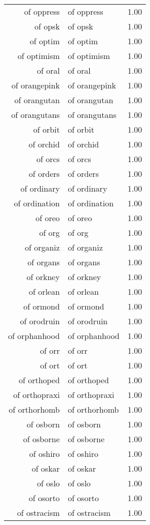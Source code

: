 \begin{table}[ht]
\begin{tabular}{rlr}
  of oppress & of oppress & 1.00 \\ 
  of opsk & of opsk & 1.00 \\ 
  of optim & of optim & 1.00 \\ 
  of optimism & of optimism & 1.00 \\ 
  of oral & of oral & 1.00 \\ 
  of orangepink & of orangepink & 1.00 \\ 
  of orangutan & of orangutan & 1.00 \\ 
  of orangutans & of orangutans & 1.00 \\ 
  of orbit & of orbit & 1.00 \\ 
  of orchid & of orchid & 1.00 \\ 
  of orcs & of orcs & 1.00 \\ 
  of orders & of orders & 1.00 \\ 
  of ordinary & of ordinary & 1.00 \\ 
  of ordination & of ordination & 1.00 \\ 
  of oreo & of oreo & 1.00 \\ 
  of org & of org & 1.00 \\ 
  of organiz & of organiz & 1.00 \\ 
  of organs & of organs & 1.00 \\ 
  of orkney & of orkney & 1.00 \\ 
  of orlean & of orlean & 1.00 \\ 
  of ormond & of ormond & 1.00 \\ 
  of orodruin & of orodruin & 1.00 \\ 
  of orphanhood & of orphanhood & 1.00 \\ 
  of orr & of orr & 1.00 \\ 
  of ort & of ort & 1.00 \\ 
  of orthoped & of orthoped & 1.00 \\ 
  of orthopraxi & of orthopraxi & 1.00 \\ 
  of orthorhomb & of orthorhomb & 1.00 \\ 
  of osborn & of osborn & 1.00 \\ 
  of osborne & of osborne & 1.00 \\ 
  of oshiro & of oshiro & 1.00 \\ 
  of oskar & of oskar & 1.00 \\ 
  of oslo & of oslo & 1.00 \\ 
  of osorto & of osorto & 1.00 \\ 
  of ostracism & of ostracism & 1.00 \\ 

\end{tabular}
\end{table}
